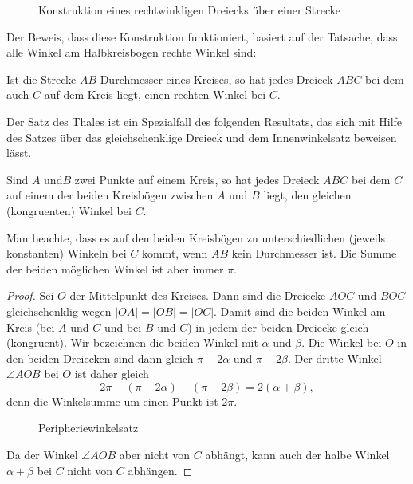 \begin{figure}[h]
    
    \caption{Konstruktion eines rechtwinkligen Dreiecks über einer Strecke}
\end{figure}

Der Beweis, dass diese Konstruktion funktioniert, basiert auf der Tatsache, dass alle Winkel am
Halbkreisbogen rechte Winkel sind:

\begin{thm}
    Ist die Strecke $AB$ Durchmesser eines Kreises, so hat jedes Dreieck $ABC$ bei dem auch $C$ auf
    dem Kreis liegt, einen rechten Winkel bei $C$.
\end{thm}

Der Satz des Thales ist ein Spezialfall des folgenden Resultats,
das sich mit Hilfe des Satzes über das gleichschenklige Dreieck %
und dem Innenwinkelsatz beweisen lässt.

\begin{thm}
    Sind $A$ und$B$ zwei Punkte auf einem Kreis, so hat jedes Dreieck $ABC$ bei dem $C$ auf einem
    der beiden Kreisbögen zwischen $A$ und $B$ liegt, den gleichen (kongruenten) Winkel bei $C$.
\end{thm}

Man beachte, dass es auf den beiden Kreisbögen zu unterschiedlichen (jeweils konstanten) Winkeln bei
$C$ kommt, wenn $AB$ kein Durchmesser ist. Die Summe der beiden möglichen Winkel ist aber immer
$\pi$.

\begin{proof}
    Sei $O$ der Mittelpunkt des Kreises. Dann sind die Dreiecke $AOC$ und $BOC$ gleichschenklig
    wegen $|OA|=|OB|=|OC|$.  Damit sind die beiden Winkel am Kreis (bei $A$ und $C$ und bei $B$ und
    $C$) in jedem der beiden Dreiecke gleich (kongruent).  Wir bezeichnen die beiden Winkel mit
    $\alpha$ und $\beta$.  Die Winkel bei $O$ in den beiden Dreiecken sind dann gleich $\pi-2\alpha$
    und $\pi-2\beta$.  Der dritte Winkel $\angle AOB$ bei $O$ ist daher gleich
    $$
        2\pi - (\pi-2\alpha) - (\pi-2\beta) = 2 (\alpha + \beta),
    $$
    denn die Winkelsumme um einen Punkt ist $2\pi$.


    \begin{figure}[h]
        
        \caption{Peripheriewinkelsatz}
    \end{figure}


    Da der Winkel $\angle AOB$ aber nicht von $C$ abhängt, kann auch der halbe Winkel $\alpha+\beta$
    bei $C$ nicht von $C$ abhängen.
\end{proof}

